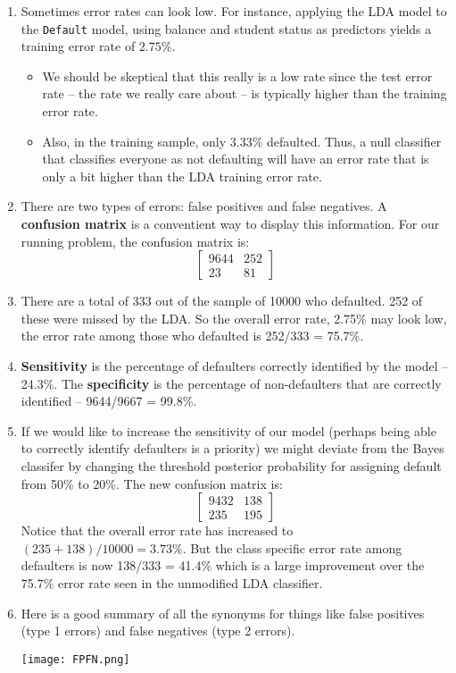 \documentclass[10pt]{article}
\begin{document}
\begin{enumerate}
	\item Sometimes error rates can look low.  For instance, applying the LDA model to the {\tt Default} model, using balance and student status as predictors yields a training error rate of $2.75\%$. \begin{itemize}
		\item We should be skeptical that this really is a low rate since the test error rate -- the rate we really care about -- is typically higher than the training error rate.
		\item   Also, in the training sample, only 3.33\% defaulted.  Thus, a null classifier that classifies everyone as not defaulting will have an error rate that is only a bit higher than the LDA training error rate.
	\end{itemize} 
	\item There are two types of errors: false positives and false negatives.  A \textbf{confusion matrix} is a conventient way to display this information.  For our running problem, the confusion matrix is: 
	$$\begin{bmatrix} 
		9644 & 252 \\
		23 & 81 \end{bmatrix}$$
	\item There are a total of 333 out of the sample of 10000 who defaulted.  252 of these were missed by the LDA.  So the overall error rate, 2.75\% may look low, the error rate among those who defaulted is 252/333 = 75.7\%.
	\item \textbf{Sensitivity} is the percentage of defaulters correctly identified by the model -- 24.3\%.  The \textbf{specificity} is the percentage of non-defaulters that are correctly identified -- 9644/9667 = 99.8\%.
	\item If we would like to increase the sensitivity of our model (perhaps being able to correctly identify defaulters is a priority) we might deviate from the Bayes classifer by changing the threshold posterior probability for assigning default from 50\% to 20\%.  The new confusion matrix is: 
	$$\begin{bmatrix} 9432 & 138 \\ 235 & 195 \end{bmatrix} $$ 
	Notice that the overall error rate has increased to $(235 + 138)/10000 = 3.73\%$.  But the class specific error rate among defaulters is now 138/333 = 41.4\% which is a large improvement over the 75.7\% error rate seen in the unmodified LDA classifier.
	\item Here is a good summary of all the synonyms for things like false positives (type 1 errors) and false negatives (type 2 errors).
	
	\texttt{[image: FPFN.png]}
\end{enumerate}
\end{document}
